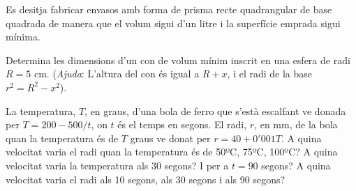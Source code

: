 \begin{mylist}
	
	
	\exer  Es desitja fabricar envasos amb forma de prisma recte quadrangular de base quadrada de manera que el volum sigui d'un litre i la superfície emprada sigui mínima. 
	
	
	
	\exer  Determina les dimensions d'un con de volum mínim inscrit en una esfera de radi $R = 5$ cm. (\textit{Ajuda}: L'altura del con és igual a $R + x$, i el radi de la base $r^2 = R^2 - x^2$).
	
	

	
	
	\exer La temperatura, $T$, en graus, d'una bola de ferro que s'està escalfant ve donada per $T = 200 - 500/t$, on $t$ és el temps en segons.  El radi, $r$, en mm, de la bola quan la temperatura és de $T$ graus ve donat per $r = 40 + 0'001T$. A quina velocitat varia el radi quan la temperatura és de 50ºC, 75ºC, 100ºC? A quina velocitat varia la temperatura als 30 segons? I per a  $t = 90$ segons? A quina velocitat varia el radi als 10 segons, als 30 segons i als 90 segons?
	

\end{mylist}
